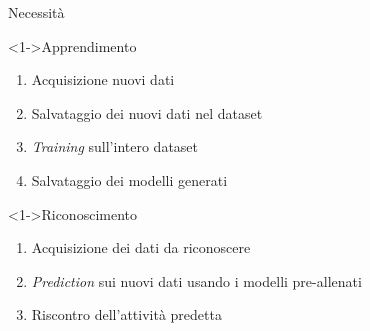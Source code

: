 \begin{tframe}{Necessità}

    \begin{block}<1->{Apprendimento}

        \begin{enumerate}
            \item Acquisizione nuovi dati
            \item Salvataggio dei nuovi dati nel dataset
            \item \textit{Training} sull'intero dataset
            \item Salvataggio dei modelli generati
        \end{enumerate}

    \end{block}

    \begin{block}<1->{Riconoscimento}

        \begin{enumerate}
            \item Acquisizione dei dati da riconoscere
            \item \textit{Prediction} sui nuovi dati usando i modelli pre-allenati
            \item Riscontro dell'attività predetta  
        \end{enumerate}

    \end{block}    

\end{tframe}